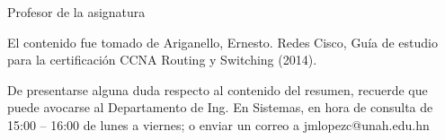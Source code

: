 \documentclass[12pt]{article}
\begin{document}
{\small Profesor de la asignatura\\}

{\footnotesize 
El contenido fue tomado de Ariganello, Ernesto. Redes Cisco, Guía de estudio para la certificación CCNA Routing y Switching (2014).

De presentarse alguna duda respecto al contenido del resumen, recuerde que puede avocarse al Departamento de Ing. En Sistemas, en hora de consulta de 15:00 – 16:00 de lunes a viernes; o enviar un correo a jmlopezc@unah.edu.hn}
\end{document}
